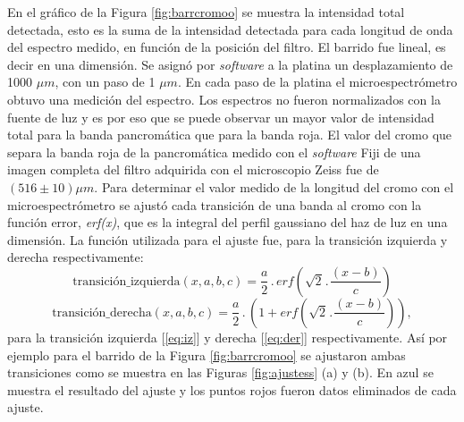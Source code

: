En el gráfico de la Figura \ref{fig:barrcromoo} se muestra la intensidad total detectada, esto es la suma de la intensidad detectada para cada longitud de onda del espectro medido, en función de la posición del filtro. El barrido fue lineal, es decir en una dimensión. Se asignó por \textit{software} a la platina un desplazamiento de 1000 $\mu m$, con un paso de 1 $\mu m$. En cada paso de la platina el microespectrómetro obtuvo una medición del espectro. Los espectros no fueron normalizados con la fuente de luz y es por eso que se puede observar un mayor valor de intensidad total para la banda pancromática que para la banda roja. El valor del cromo que separa la banda roja de la pancromática medido con el \textit{software} Fiji de una imagen completa del filtro adquirida con el microscopio Zeiss fue de $( 516 \pm 10) \mu m$.
Para determinar el valor medido de la longitud del cromo con el microespectrómetro se ajustó cada transición de una banda al cromo con la función error, \textit{erf(x)}, que es la integral del perfil gaussiano del haz de luz en una dimensión. La función utilizada para el ajuste fue, para la transición izquierda y derecha respectivamente:
\begin{equation}
\text{transición\_izquierda} (x,a,b,c) = \frac{a}{2}\hspace{2pt}.\hspace{2pt}erf\left(\sqrt{2}\hspace{1pt}.\hspace{1pt}\frac{(x-b)}{c}\right)
\label{eq:iz}
\end{equation}
\begin{equation}
\text{transición\_derecha} (x,a,b,c) = \frac{a}{2}\hspace{2pt}.\hspace{2pt}\left(1+erf\left(\sqrt{2}\hspace{1pt}.\hspace{1pt}\frac{(x-b)}{c}\right)\right),
\label{eq:der}
 \end{equation} para la transición izquierda [\ref{eq:iz}] y derecha [\ref{eq:der}] respectivamente. Así por ejemplo para el barrido de la Figura \ref{fig:barrcromoo} se ajustaron ambas transiciones como se muestra en las Figuras \ref{fig:ajustess} (a) y (b). En azul se muestra el resultado del ajuste y los puntos rojos fueron datos eliminados de cada ajuste.
